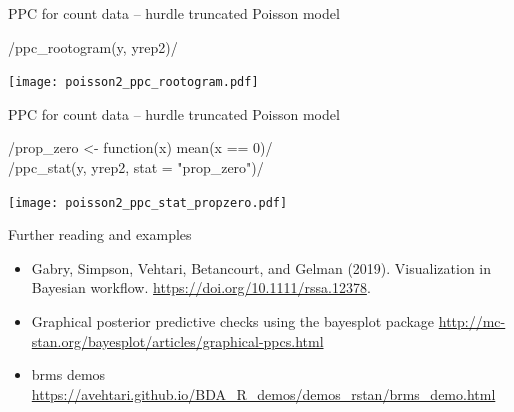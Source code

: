 \documentclass[t]{beamer}
\begin{document}
\begin{frame}{PPC for count data -- hurdle truncated Poisson model}
  
  \vspace{-1\baselineskip}
  \rinline/ppc_rootogram(y, yrep2)/

    \texttt{[image: poisson2\_ppc\_rootogram.pdf]}

\end{frame}

\begin{frame}{PPC for count data -- hurdle truncated Poisson model}
  
  \vspace{-1\baselineskip}
  \rinline/prop_zero <- function(x) mean(x == 0)/\\
  \rinline/ppc_stat(y, yrep2, stat = "prop_zero")/

    \texttt{[image: poisson2\_ppc\_stat\_propzero.pdf]}

\end{frame}

\begin{frame}{Further reading and examples}

  \begin{itemize}
  \item Gabry, Simpson, Vehtari, Betancourt, and Gelman
    (2019). Visualization in Bayesian
    workflow. \url{https://doi.org/10.1111/rssa.12378}.
  \item Graphical posterior predictive checks using the bayesplot package
    \url{http://mc-stan.org/bayesplot/articles/graphical-ppcs.html}
  \item brms demos \url{https://avehtari.github.io/BDA_R_demos/demos_rstan/brms_demo.html}

  \end{itemize}
  
\end{frame}
\end{document}

